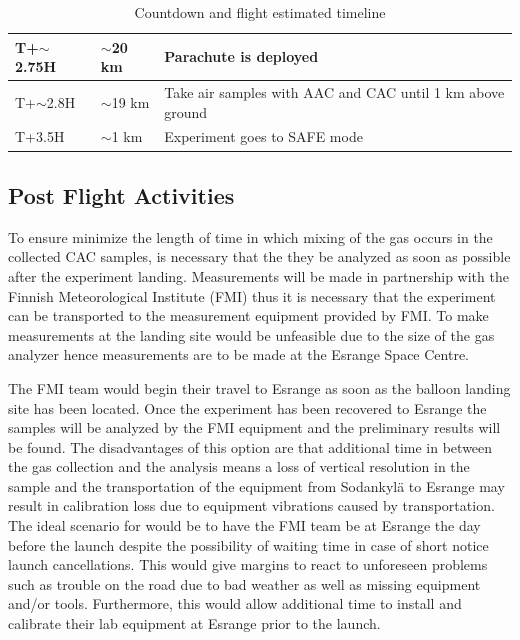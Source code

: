 \documentclass[a4paper,12pt,twoside]{article}
\begin{document}
\begin{table}[H]
\begin{tabular}{|l|l|l|}
T+$\sim$2.75H                    & $\sim$20 km                        & Parachute is deployed                                    \\ \hline
T+$\sim$2.8H                     & $\sim$19 km                        & Take air samples with AAC and CAC until 1 km above ground                 \\ \hline
T+3.5H                           & $\sim$1 km                         & Experiment goes to SAFE mode                             \\ \hline
\end{tabular}
\caption{Countdown and flight estimated timeline}
\label{tab:countflight}
\end{table}
\raggedbottom
\pagebreak
\subsection{Post Flight Activities}

To ensure minimize the length of time in which mixing of the gas occurs in the collected CAC samples, is necessary that the they  be analyzed as soon as possible after the experiment landing. Measurements will be made in partnership with the Finnish Meteorological Institute (FMI) thus it is necessary that the experiment can be transported to the measurement equipment provided by FMI. To make measurements at the landing site would be unfeasible due to the size of the gas analyzer hence measurements are to be made at the Esrange Space Centre.

The FMI team would begin their travel to Esrange as soon as the balloon landing site has been located. Once the experiment has been recovered to Esrange the samples will be analyzed by the FMI equipment and the preliminary results will be found. The disadvantages of this option are that additional time in between the gas collection and the analysis means a loss of vertical resolution in the sample and the transportation of the equipment from Sodankylä to Esrange may result in calibration loss due to equipment vibrations caused by transportation. The ideal scenario for would be to have the FMI team be at Esrange the day before the launch despite the possibility of waiting time in case of short notice launch cancellations. This would give margins to react to unforeseen problems such as trouble on the road due to bad weather as well as missing equipment and/or tools. Furthermore, this would allow additional time to install and calibrate their lab equipment at Esrange prior to the launch.
\end{document}
